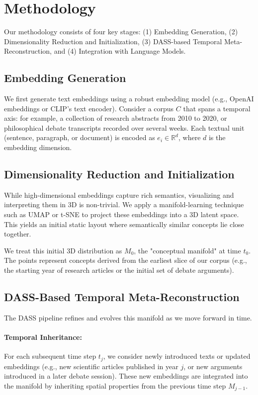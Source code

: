 \documentclass{article}
\begin{document}
\section{Methodology}
Our methodology consists of four key stages: (1) Embedding Generation, (2) Dimensionality Reduction and Initialization, (3) DASS-based Temporal Meta-Reconstruction, and (4) Integration with Language Models.

\subsection{Embedding Generation}
We first generate text embeddings using a robust embedding model (e.g., OpenAI embeddings or CLIP's text encoder). Consider a corpus $C$ that spans a temporal axis: for example, a collection of research abstracts from 2010 to 2020, or philosophical debate transcripts recorded over several weeks. Each textual unit (sentence, paragraph, or document) is encoded as $e_i \in \mathbb{R}^d$, where $d$ is the embedding dimension.

\subsection{Dimensionality Reduction and Initialization}
While high-dimensional embeddings capture rich semantics, visualizing and interpreting them in 3D is non-trivial. We apply a manifold-learning technique such as UMAP \cite{mcinnes2018umap} or t-SNE \cite{maaten2008visualizing} to project these embeddings into a 3D latent space. This yields an initial static layout where semantically similar concepts lie close together.

We treat this initial 3D distribution as $M_0$, the "conceptual manifold" at time $t_0$. The points represent concepts derived from the earliest slice of our corpus (e.g., the starting year of research articles or the initial set of debate arguments).

\subsection{DASS-Based Temporal Meta-Reconstruction}
The DASS pipeline refines and evolves this manifold as we move forward in time.

\paragraph{Temporal Inheritance:}
For each subsequent time step $t_j$, we consider newly introduced texts or updated embeddings (e.g., new scientific articles published in year $j$, or new arguments introduced in a later debate session). These new embeddings are integrated into the manifold by inheriting spatial properties from the previous time step $M_{j-1}$.
\end{document}
